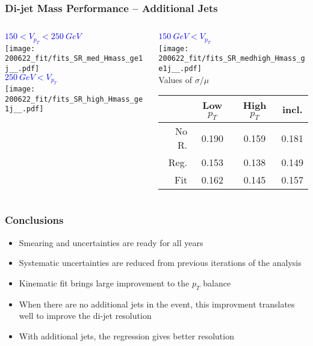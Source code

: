 \documentclass{beamer}
\begin{document}
\begin{frame}
  \frametitle{Di-jet Mass Performance -- Additional Jets}


  \begin{columns}
    \begin{column}{0.5\linewidth}
      \centering
      \textcolor{blue}{$150 < V_{p_T} < \SI{250}{GeV}$} \\
      \texttt{[image: 200622\_fit/fits\_SR\_med\_Hmass\_ge1j\_\_.pdf]} \\
      \textcolor{blue}{$\SI{250}{GeV} < V_{p_T}$} \\
      \texttt{[image: 200622\_fit/fits\_SR\_high\_Hmass\_ge1j\_\_.pdf]}
    \end{column}
    \begin{column}{0.5\linewidth}
      \centering
      \textcolor{blue}{$\SI{150}{GeV} < V_{p_T}$} \\
      \texttt{[image: 200622\_fit/fits\_SR\_medhigh\_Hmass\_ge1j\_\_.pdf]} \\

      Values of $\sigma/\mu$
      {\scriptsize
      \begin{tabular}{|r|c|c|c|}
        \hline
        & Low $p_T$ & High $p_T$ & incl. \\
        \hline
        No R. & 0.190 & 0.159 & 0.181 \\
        Reg.  & 0.153 & 0.138 & 0.149 \\
        Fit   & 0.162 & 0.145 & 0.157 \\
        \hline
      \end{tabular}
      }
    \end{column}
  \end{columns}

\end{frame}

\begin{frame}
  \frametitle{Conclusions}

  \begin{itemize}
  \item Smearing and uncertainties are ready for all years
  \item Systematic uncertainties are reduced from previous iterations of the analysis
  \item Kinematic fit brings large improvement to the $p_T$ balance
  \item When there are no additional jets in the event,
    this improvment translates well to improve the di-jet resolution
  \item With additional jets, the regression gives better resolution
  \end{itemize}

\end{frame}
\end{document}

